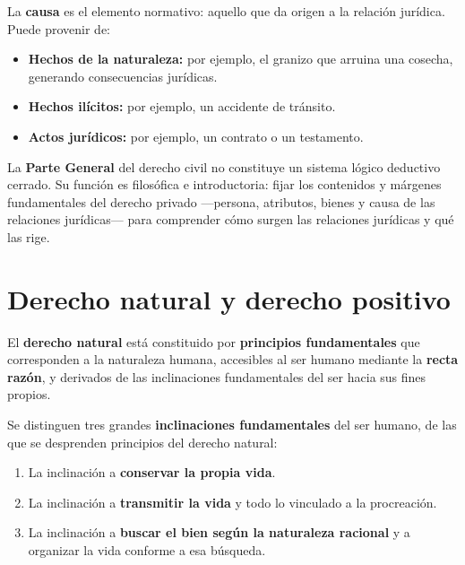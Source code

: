 \documentclass[12pt, a4paper]{report}
\begin{document}
La \textbf{causa} es el elemento normativo: aquello que da origen a la relación
jurídica. Puede provenir de:

\begin{itemize}
  \item \textbf{Hechos de la naturaleza:} por ejemplo, el granizo que arruina
        una cosecha, generando consecuencias jurídicas.
  \item \textbf{Hechos ilícitos:} por ejemplo, un accidente de tránsito.
  \item \textbf{Actos jurídicos:} por ejemplo, un contrato o un testamento.
\end{itemize}

\begin{important}
La \textbf{Parte General} del derecho civil no constituye un sistema lógico
deductivo cerrado. Su función es filosófica e introductoria: fijar los
contenidos y márgenes fundamentales del derecho privado ---persona, atributos,
bienes y causa de las relaciones jurídicas--- para comprender cómo surgen las
relaciones jurídicas y qué las rige.
\end{important}

\section{Derecho natural y derecho positivo}

\begin{definition}
El \textbf{derecho natural} está constituido por \textbf{principios
fundamentales} que corresponden a la naturaleza humana, accesibles al ser humano
mediante la \textbf{recta razón}, y derivados de las inclinaciones fundamentales
del ser hacia sus fines propios.
\end{definition}

Se distinguen tres grandes \textbf{inclinaciones fundamentales} del ser humano,
de las que se desprenden principios del derecho natural:

\begin{enumerate}
  \item La inclinación a \textbf{conservar la propia vida}.
  \item La inclinación a \textbf{transmitir la vida} y todo lo vinculado a la
        procreación.
  \item La inclinación a \textbf{buscar el bien según la naturaleza racional} y
        a organizar la vida conforme a esa búsqueda.
\end{enumerate}
\end{document}
